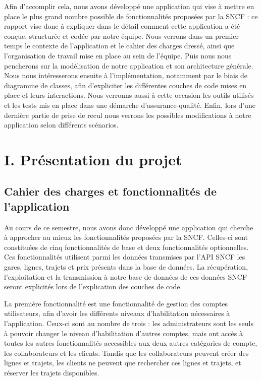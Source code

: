 \documentclass[
  french,
  11pt,
  letterpaper,
  DIV=11,
  numbers=noendperiod]{scrartcl}
\begin{document}
Afin d'accomplir cela, nous avons développé une application qui vise à
mettre en place le plus grand nombre possible de fonctionnalités
proposées par la SNCF : ce rapport vise donc à expliquer dans le détail
comment cette application a été conçue, structurée et codée par notre
équipe. Nous verrons dans un premier temps le contexte de l'application
et le cahier des charges dressé, ainsi que l'organisation de travail
mise en place au sein de l'équipe. Puis nous nous pencherons sur la
modélisation de notre application et son architecture générale. Nous
nous intéresserons ensuite à l'implémentation, notamment par le biais de
diagramme de classes, afin d'expliciter les différentes couches de code
mises en place et leurs interactions. Nous verronns aussi à cette
occasion les outils utilisés et les tests mis en place dans une démarche
d'assurance-qualité. Enfin, lors d'une dernière partie de prise de recul
nous verrons les possibles modifications à notre application selon
différents scénarios.

\section{I. Présentation du projet}\label{i.-pruxe9sentation-du-projet}

\subsection{Cahier des charges et fonctionnalités de
l'application}\label{cahier-des-charges-et-fonctionnalituxe9s-de-lapplication}

Au cours de ce semestre, nous avons donc développé une application qui
cherche à approcher au mieux les fonctionnalités proposées par la SNCF.
Celles-ci sont constituées de cinq fonctionnalités de base et deux
fonctionnalités optionnelles. Ces fonctionnalités utilisent parmi les
données transmises par l'API SNCF les gares, lignes, trajets et prix
présents dans la base de données. La récupération, l'exploitation et la
transmission à notre base de données de ces données SNCF seront
explicités lors de l'explication des couches de code.

La première fonctionnalité est une fonctionnalité de gestion des comptes
utilisateurs, afin d'avoir les différents niveaux d'habilitation
nécessaires à l'application. Ceux-ci sont au nombre de trois : les
administrateurs sont les seuls à pouvoir changer le niveau
d'habilitation d'autres comptes, mais ont accès à toutes les autres
fonctionnalités accessibles aux deux autres catégories de compte, les
collaborateurs et les clients. Tandis que les collaborateurs peuvent
créer des lignes et trajets, les clients ne peuvent que rechercher ces
lignes et trajets, et réserver les trajets disponibles.
\end{document}
